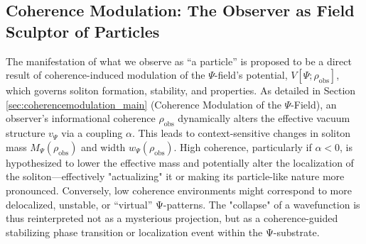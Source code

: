 \documentclass[11pt, a4paper]{book}
\begin{document}
\subsection{Coherence Modulation: The Observer as Field Sculptor of Particles}
\label{ssec:particles_coherencemod_mainpaper}
The manifestation of what we observe as “a particle” is proposed to be a direct result of coherence-induced modulation of the $\Psi$-field's potential, $V[\Psi; \rho_{\text{obs}}]$, which governs soliton formation, stability, and properties. As detailed in Section \ref{sec:coherencemodulation_main} (Coherence Modulation of the $\Psi$-Field), an observer’s informational coherence $\rho_{\text{obs}}$ dynamically alters the effective vacuum structure $v_\Psi$ via a coupling $\alpha$. This leads to context-sensitive changes in soliton mass $M_\Psi(\rho_{\text{obs}})$ and width $w_\Psi(\rho_{\text{obs}})$. High coherence, particularly if $\alpha < 0$, is hypothesized to lower the effective mass and potentially alter the localization of the soliton—effectively "actualizing" it or making its particle-like nature more pronounced. Conversely, low coherence environments might correspond to more delocalized, unstable, or “virtual” Ψ-patterns. The "collapse" of a wavefunction is thus reinterpreted not as a mysterious projection, but as a coherence-guided stabilizing phase transition or localization event within the Ψ-substrate.
\end{document}
